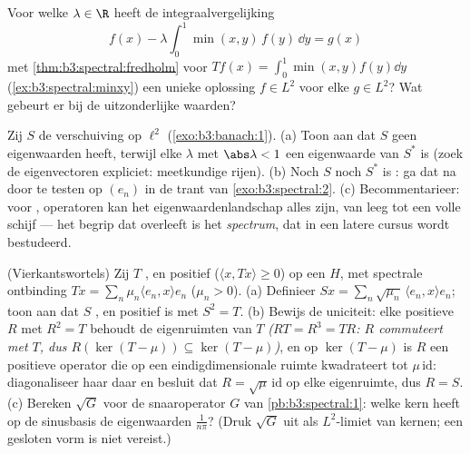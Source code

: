 \begin{exercise}[$\star\star$]\label{exo:b3:spectral:9}
Voor welke $\lambda \in \R$ heeft de integraalvergelijking
\[
f(x) - \lambda\int_0^1\min(x,y)\,f(y)\,\dd y = g(x)
\]
met \cref{thm:b3:spectral:fredholm} voor $Tf(x) =
\int_0^1\min(x,y)f(y)\dd y$ (\cref{ex:b3:spectral:minxy}) een
unieke oplossing $f \in L^2$ voor elke $g \in L^2$? Wat gebeurt
er bij de uitzonderlijke waarden?
\end{exercise}

\begin{exercise}[$\star\star\star$]\label{exo:b3:spectral:10}
Zij $S$ de verschuiving op $\ell^2$ (\cref{exo:b3:banach:1}).
(a) Toon aan dat $S$ geen eigenwaarden heeft, terwijl elke
$\lambda$ met $\abs\lambda < 1$ een eigenwaarde van $S^*$ is
(zoek de eigenvectoren expliciet: meetkundige rijen).
(b) Noch $S$ noch $S^*$ is : ga dat na door te testen op
$(e_n)$ in de trant van \cref{exo:b3:spectral:2}.
(c) Becommentarieer: voor , 
operatoren kan het eigenwaardenlandschap alles zijn, van leeg tot
een volle schijf --- het begrip dat overleeft is het
\emph{spectrum}, dat in een latere cursus wordt bestudeerd.
\end{exercise}

\begin{exercise}[$\star\star$]\label{exo:b3:spectral:11}
(Vierkantswortels) Zij $T$ ,  en positief
($\langle x, Tx\rangle \geq 0$) op een  $H$, met
spectrale ontbinding $Tx = \sum_n\mu_n\langle e_n, x\rangle e_n$
($\mu_n > 0$).
(a) Definieer $Sx = \sum_n\sqrt{\mu_n}\,\langle e_n, x\rangle
e_n$; toon aan dat $S$ ,  en positief is met
$S^2 = T$.
(b) Bewijs de uniciteit: elke  positieve 
$R$ met $R^2 = T$ behoudt de eigenruimten van $T$ \emph{($RT =
R^3 = TR$: $R$ commuteert met $T$, dus $R(\ker(T - \mu))
\subseteq \ker(T - \mu)$)}, en op $\ker(T - \mu)$ is $R$ een
positieve operator die op een eindigdimensionale ruimte kwadrateert
tot $\mu\,\mathrm{id}$: diagonaliseer haar daar en besluit dat $R
= \sqrt\mu\,\mathrm{id}$ op elke eigenruimte, dus $R = S$.
(c) Bereken $\sqrt G$ voor de snaaroperator $G$ van
\cref{pb:b3:spectral:1}: welke kern heeft op de sinusbasis de
eigenwaarden $\frac1{n\pi}$? (Druk $\sqrt G$ uit als
$L^2$-limiet van kernen; een gesloten vorm is niet vereist.)
\end{exercise}

